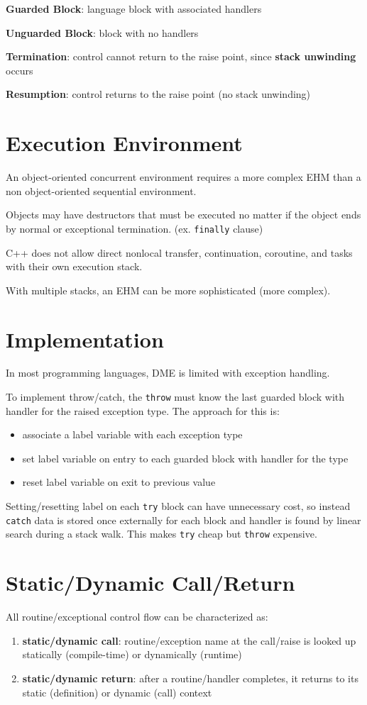 \documentclass[11pt]{article}
\begin{document}
\textbf{Guarded Block}: language block with associated handlers

\textbf{Unguarded Block}: block with no handlers

\textbf{Termination}: control cannot return to the raise point, since \textbf{stack unwinding} occurs

\textbf{Resumption}: control returns to the raise point (no stack unwinding)
\section{Execution Environment}
\label{sec:org9df891e}
An object-oriented concurrent environment requires a more complex EHM than a non object-oriented sequential
environment.

Objects may have destructors that must be executed no matter if the object ends by normal or exceptional
termination. (ex. \texttt{finally} clause)

C++ does not allow direct nonlocal transfer, continuation, coroutine, and tasks with their own execution
stack.

With multiple stacks, an EHM can be more sophisticated (more complex).
\section{Implementation}
\label{sec:org2f95967}
In most programming languages, DME is limited with exception handling.

To implement throw/catch, the \texttt{throw} must know the last guarded block with handler for the raised
exception type. The approach for this is:
\begin{itemize}
\item associate a label variable with each exception type
\item set label variable on entry to each guarded block with handler for the type
\item reset label variable on exit to previous value
\end{itemize}

Setting/resetting label on each \texttt{try} block can have unnecessary cost, so instead \texttt{catch} data is
stored once externally for each block and handler is found by linear search during a stack walk.
This makes \texttt{try} cheap but \texttt{throw} expensive.
\section{Static/Dynamic Call/Return}
\label{sec:org71833c0}
All routine/exceptional control flow can be characterized as:
\begin{enumerate}
\item \textbf{static/dynamic call}: routine/exception name at the call/raise is looked up statically (compile-time)
or dynamically (runtime)
\item \textbf{static/dynamic return}: after a routine/handler completes, it returns to its static (definition) or
dynamic (call) context
\end{enumerate}
\end{document}
